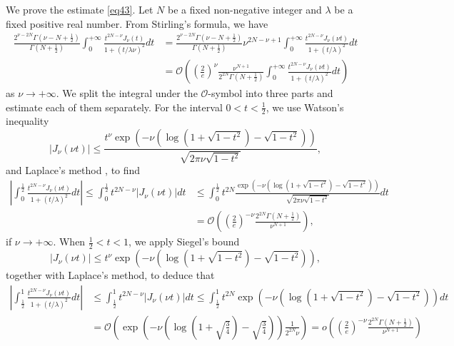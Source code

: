 \documentclass[a4paper,twoside,10pt]{amsart}
\numberwithin{equation}{section}
\begin{document}
We prove the estimate \eqref{eq43}. Let $N$ be a fixed non-negative integer and $\lambda$ be a fixed positive real number. From Stirling's formula, we have
\begin{align*}
\frac{{2^{\nu  - 2N} \Gamma \left( {\nu  - N + \frac{1}{2}} \right)}}{{\Gamma \left( {N + \frac{1}{2}} \right)}}\int_0^{ + \infty } {\frac{{t^{2N - \nu } J_\nu  \left( t \right)}}{{1 + \left( {t/\lambda \nu } \right)^2 }}dt} & = \frac{{2^{\nu  - 2N} \Gamma \left( {\nu  - N + \frac{1}{2}} \right)}}{{\Gamma \left( {N + \frac{1}{2}} \right)}}\nu ^{2N - \nu  + 1} \int_0^{ + \infty } {\frac{{t^{2N - \nu } J_\nu  \left( {\nu t} \right)}}{{1 + \left( {t/\lambda } \right)^2 }}dt}  \\
&  = \mathcal{O}\left( {\left( {\frac{2}{e}} \right)^\nu  \frac{{\nu ^{N + 1} }}{{2^{2N} \Gamma \left( {N + \frac{1}{2}} \right)}}\int_0^{ + \infty } {\frac{{t^{2N - \nu } J_\nu  \left( {\nu t} \right)}}{{1 + \left( {t/\lambda } \right)^2 }}dt} } \right)
\end{align*}
as $\nu \to +\infty$. We split the integral under the $\mathcal{O}$-symbol into three parts and estimate each of them separately. For the interval $0<t<\frac{1}{2}$, we use Watson's inequality \cite[p. 255, expression (9)]{Watson}
\[
\left|J_\nu  \left( {\nu t} \right)\right| \le \frac{{t^\nu  \exp \left( { - \nu \left( {\log \left( {1 + \sqrt {1 - t^2 } } \right) - \sqrt {1 - t^2 } } \right)} \right)}}{{\sqrt {2\pi \nu \sqrt {1 - t^2 } } }},
\]
and Laplace's method \cite[pp. 80--82]{Olver}, to find
\begin{align*}
\left| {\int_0^{\frac{1}{2}} {\frac{{t^{2N - \nu } J_\nu  \left( {\nu t} \right)}}{{1 + \left( {t/\lambda } \right)^2 }}dt} } \right| \le \int_0^{\frac{1}{2}} {t^{2N - \nu } \left|J_\nu  \left( {\nu t} \right)\right|dt} & \le \int_0^{\frac{1}{2}} {t^{2N} \frac{{\exp \left( { - \nu \left( {\log \left( {1 + \sqrt {1 - t^2 } } \right) - \sqrt {1 - t^2 } } \right)} \right)}}{{\sqrt {2\pi \nu \sqrt {1 - t^2 } } }}dt}  \\ &= \mathcal{O}\left( {\left( {\frac{2}{e}} \right)^{ - \nu } \frac{{2^{2N} \Gamma \left( {N + \frac{1}{2}} \right)}}{{\nu ^{N + 1} }}} \right),
\end{align*}
if $\nu \to +\infty$. When $\frac{1}{2} <t<1$, we apply Siegel's bound \cite{Siegel}
\[
\left|J_\nu  \left( {\nu t} \right)\right| \le t^\nu  \exp \left( { - \nu \left( {\log \left( {1 + \sqrt {1 - t^2 } } \right) - \sqrt {1 - t^2 } } \right)} \right),
\]
together with Laplace's method, to deduce that
\begin{align*}
\left| {\int_{\frac{1}{2}}^1 {\frac{{t^{2N - \nu } J_\nu  \left( {\nu t} \right)}}{{1 + \left( {t/\lambda } \right)^2 }}dt} } \right| & \le \int_{\frac{1}{2}}^1 {t^{2N - \nu } \left|J_\nu  \left( {\nu t} \right)\right|dt}  \le \int_{\frac{1}{2}}^1 {t^{2N} \exp \left( { - \nu \left( {\log \left( {1 + \sqrt {1 - t^2 } } \right) - \sqrt {1 - t^2 } } \right)} \right)dt} 
\\ & = \mathcal{O}\left( {\exp \left( { - \nu \left( {\log \left( {1 + \sqrt {\frac{3}{4}} } \right) - \sqrt {\frac{3}{4}} } \right)} \right)\frac{1}{2^{2N}\nu}} \right) = o\left( {\left( {\frac{2}{e}} \right)^{-\nu}  \frac{{2^{2N} \Gamma \left( {N + \frac{1}{2}} \right)}}{\nu ^{N + 1}} } \right)
\end{align*}
\end{document}
